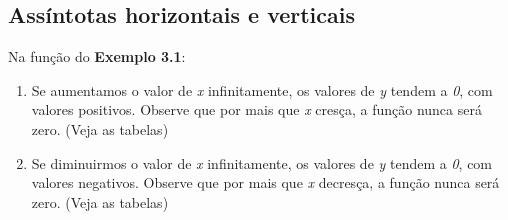 \subsection{Assíntotas horizontais e verticais}

Na função do \textbf{Exemplo 3.1}:

\begin{enumerate}[label=(\roman*)]
	\item Se aumentamos o valor de \textit{x} infinitamente, os valores de \textit{y} tendem a \textit{0}, com valores positivos. Observe que por mais que \textit{x} cresça, a função nunca será zero. (Veja as tabelas)

	\item Se diminuirmos o valor de \textit{x} infinitamente, os valores de \textit{y} tendem a \textit{0}, com valores negativos. Observe que por mais que \textit{x} decresça, a função nunca será zero. (Veja as tabelas)
\end{enumerate}

